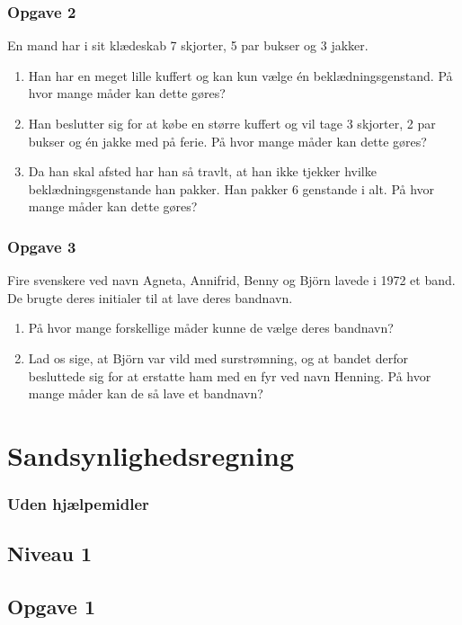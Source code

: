 \subsubsection*{Opgave 2}
En mand har i sit klædeskab 7 skjorter, 5 par bukser og 3 jakker.
\begin{enumerate}[label=\roman*)]
	\item Han har en meget lille kuffert og kan kun vælge én beklædningsgenstand. På hvor mange måder kan dette gøres?
	\item Han beslutter sig for at købe en større kuffert og vil tage 3 skjorter, 2 par bukser og én jakke med på ferie. På hvor mange måder kan dette gøres?
	\item Da han skal afsted har han så travlt, at han ikke tjekker hvilke beklædningsgenstande han pakker. Han pakker 6 genstande i alt. På hvor mange måder kan dette gøres?
\end{enumerate}

\subsubsection*{Opgave 3}
Fire svenskere ved navn Agneta, Annifrid, Benny og Björn lavede i 1972 et band. De brugte deres initialer til at lave deres bandnavn.
\begin{enumerate}[label=\roman*)]
	\item På hvor mange forskellige måder kunne de vælge deres bandnavn?
	\item Lad os sige, at Björn var vild med surstrømning, og at bandet derfor besluttede sig for at erstatte ham med en fyr ved navn Henning. På hvor mange måder kan de så lave et bandnavn?
\end{enumerate}

\newpage

\section*{Sandsynlighedsregning}

\subsubsection*{Uden hjælpemidler}

\subsection*{Niveau 1}

\subsection*{Opgave 1}


